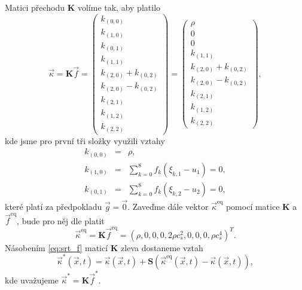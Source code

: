 Matici přechodu $ \mathbf{K} $ volíme tak, aby platilo
\begin{equation}\label{eq:srt_matrixK}
\vec{\kappa} = \mathbf{K} \vec{f} =
\begin{pmatrix}
k_{(0,0)} \\
k_{(1,0)} \\
k_{(0,1)} \\
k_{(1,1)} \\
k_{(2,0)} + k_{(0,2)} \\
k_{(2,0)} - k_{(0,2)} \\
k_{(2,1)} \\
k_{(1,2)} \\
k_{(2,2)}
\end{pmatrix}
=
\begin{pmatrix}
\rho \\
0 \\
0 \\
k_{(1,1)} \\
k_{(2,0)} + k_{(0,2)} \\
k_{(2,0)} - k_{(0,2)} \\
k_{(2,1)} \\
k_{(1,2)} \\
k_{(2,2)}
\end{pmatrix},
\end{equation}
kde jsme pro první tři složky využili vztahy
\begin{subequations}
	\begin{eqnarray}
	k_{(0,0)} &=& \rho,\\[3pt]
	k_{(1,0)} &=& \sum_{k=0}^{8} f_{k} (\xi_{k,1} - u_{1}) = 0,\\[3pt]
	k_{(0,1)} &=& \sum_{k=0}^{8} f_{k} (\xi_{k,2} - u_{2}) = 0,
	\end{eqnarray}
\end{subequations}
které platí za předpokladu $ \vec{g} = \vec{0}$.
Zaveďme dále vektor $ \vec{\kappa}^{\mathrm{eq}} $ pomocí matice $ \mathbf{K} $ a $ \vec{f}^{\mathrm{eq}} $, bude pro něj dle \cite{GeierCLBM} platit
\begin{equation}\label{eq:keq}
\vec{\kappa}^{\mathrm{eq}} = \mathbf{K} \vec{f}^{\mathrm{eq}} = (\rho, 0, 0, 0, 2 \rho c^{2}_{s}, 0, 0, 0, \rho c^{4}_{s})^T.
\end{equation}
Násobením \eqref{eq:srt_f} maticí $ \mathbf{K} $ zleva dostaneme vztah
\begin{equation}\label{eq:kstar}
\vec{\kappa}^{*}(\vec{x}, t) = \vec{\kappa}(\vec{x}, t) + \mathbf{S}( \vec{\kappa}^{\mathrm{eq}}(\vec{x}, t) - \vec{\kappa}(\vec{x}, t)),
\end{equation} 
kde uvažujeme $ \vec{\kappa}^{*} =  \mathbf{K} \vec{f}^{*}$.

